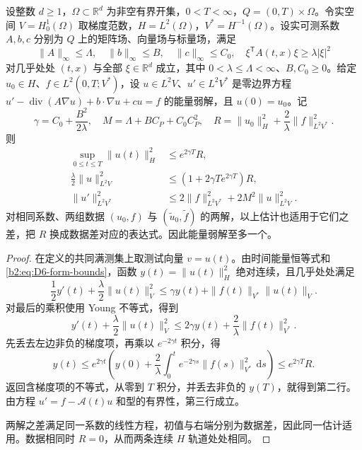 \begin{proposition}[能量估计与数据稳定性]\label{b2:prop:D6-energy-estimate}
设整数 \(d\geq1\)，\(\Omega\subset\mathbb R^d\) 为非空有界开集，\(0<T<\infty\)，\(Q=(0,T)\times\Omega\)。令实空间 \(V=H_0^1(\Omega)\) 取梯度范数，\(H=L^2(\Omega)\)，\(V^*=H^{-1}(\Omega)\)。设实可测系数 \(A,b,c\) 分别为 \(Q\) 上的矩阵场、向量场与标量场，满足
\[
 \|A\|_\infty\leq\Lambda,\quad\|b\|_\infty\leq B,
 \quad\|c\|_\infty\leq C_0,
 \quad\xi^{\mathsf T}A(t,x)\xi\geq\lambda|\xi|^2
\]
对几乎处处 \((t,x)\) 与全部 \(\xi\in\mathbb R^d\) 成立，其中 \(0<\lambda\leq\Lambda<\infty\)、\(B,C_0\geq0\)。给定 \(u_0\in H\)、\(f\in L^2(0,T;V^*)\)，设 \(u\in L^2V\)、\(u'\in L^2V^*\) 是零边界方程
\(u'-\operatorname{div}(A\nabla u)+b\cdot\nabla u+cu=f\)
的能量弱解，且 \(u(0)=u_0\)。记
\[
 \gamma=C_0+\frac{B^2}{2\lambda},\quad
 M=\Lambda+BC_P+C_0C_P^2,\quad
 R=\|u_0\|_H^2+\frac2\lambda\|f\|_{L^2V^*}^2.
\]
则
\begin{equation}\label{b2:eq:D6-energy-bounds}
 \begin{aligned}
 \sup_{0\leq t\leq T}\|u(t)\|_H^2&\leq e^{2\gamma T}R,\\
 \frac\lambda2\|u\|_{L^2V}^2
     &\leq(1+2\gamma T e^{2\gamma T})R,\\
 \|u'\|_{L^2V^*}^2
     &\leq2\|f\|_{L^2V^*}^2+2M^2\|u\|_{L^2V}^2.
 \end{aligned}
\end{equation}
对相同系数、两组数据 \((u_0,f)\) 与 \((\widetilde u_0,\widetilde f)\) 的两解，以上估计也适用于它们之差，把 \(R\) 换成数据差对应的表达式。因此能量弱解至多一个。
\end{proposition}
\begin{proof}
在定义的共同满测集上取测试向量 \(v=u(t)\)。由时间能量恒等式和\eqref{b2:eq:D6-form-bounds}，函数 \(y(t)=\|u(t)\|_H^2\) 绝对连续，且几乎处处满足
\[
 \frac12y'(t)+\frac\lambda2\|u(t)\|_V^2
 \leq\gamma y(t)+\|f(t)\|_{V^*}\|u(t)\|_V.
\]
对最后的乘积使用 Young 不等式，得到
\[
 y'(t)+\frac\lambda2\|u(t)\|_V^2
 \leq2\gamma y(t)+\frac2\lambda\|f(t)\|_{V^*}^2.
\]
先丢去左边非负的梯度项，再乘以 \(e^{-2\gamma t}\) 积分，得
\[
 y(t)\leq e^{2\gamma t}
 \left(y(0)+\frac2\lambda\int_0^t e^{-2\gamma s}\|f(s)\|_{V^*}^2\,\mathrm ds\right)
 \leq e^{2\gamma T}R.
\]
返回含梯度项的不等式，从零到 \(T\) 积分，并丢去非负的 \(y(T)\)，就得到第二行。由方程 \(u'=f-\mathcal A(t)u\) 和型的有界性，第三行成立。

两解之差满足同一系数的线性方程，初值与右端分别为数据差，因此同一估计适用。数据相同时 \(R=0\)，从而两条连续 \(H\) 轨道处处相同。
\end{proof}

